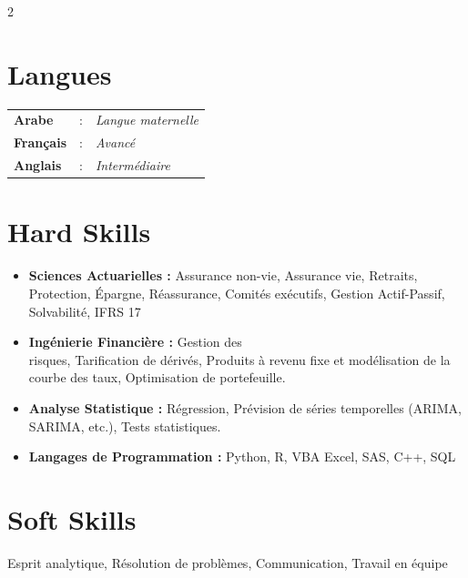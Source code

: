 \documentclass[11pt,asfal]{amdresume}
\begin{document}
\begin{paracol}{2}
\vspace{0.1cm}
\section{Langues}
\hspace{-0.8cm}
\begin{tabular}{lcl}
  \textbf{Arabe}     &  : & \textit{Langue maternelle} \\
  \textbf{Français}  &  : & \textit{Avancé} \\
  \textbf{Anglais}   &  : & \textit{Intermédiaire} \\
\end{tabular}

\vspace{0.1cm}
\section{Hard Skills}
\begin{itemize}
    \item \textbf{Sciences Actuarielles :} Assurance non-vie, Assurance vie, Retraits, Protection, Épargne, Réassurance, Comités exécutifs, Gestion Actif-Passif,\\ 
                                    Solvabilité, IFRS 17
\\ \divider 
    \item \textbf{Ingénierie Financière :} Gestion des \\ risques, Tarification de dérivés, Produits à revenu fixe et modélisation de la courbe des taux, 
                                        Optimisation de portefeuille.
\\ \divider
    \item \textbf{Analyse Statistique :} Régression, Prévision de séries temporelles (ARIMA,\\ SARIMA, etc.), Tests statistiques.
\\ \divider
    \item \textbf{Langages de Programmation :} Python, R, VBA Excel, SAS, C++, SQL
\end{itemize}

\section{Soft Skills}
Esprit analytique, Résolution de problèmes, Communication, Travail en équipe


\end{paracol}
\end{document}
